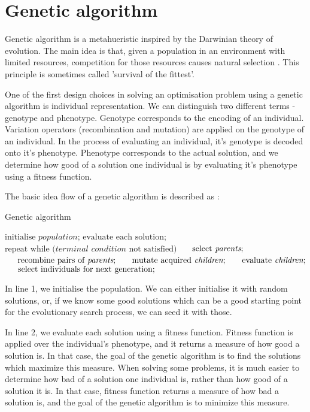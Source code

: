 \section{Genetic algorithm}
Genetic algorithm is a metahueristic inspired by the Darwinian theory of evolution. The main idea is that, given a population in an environment with limited resources, competition for those resources causes natural selection \citep{eiben2015evolutionarycomputing}.  This principle is sometimes called 'survival of the fittest'. 

One of the first design choices in solving an optimisation problem using a genetic algorithm is individual representation. We can distinguish two different terms - genotype and phenotype. Genotype corresponds to the encoding of an individual. Variation operators (recombination and mutation) are applied on the genotype of an individual. In the process of evaluating an individual, it's genotype is decoded onto it's phenotype. Phenotype corresponds to the actual solution, and we determine how good of a solution one individual is by evaluating it's phenotype using a fitness function.

The basic idea flow of a genetic algorithm is described as \citep{eiben2015evolutionarycomputing}:

\begin{algorithm}[]
\caption{Genetic algorithm}
\begin{algorithmic}[1]
\State $\text{initialise } \textit{population} \text{;}$
\State $\text{evaluate } \text{each solution};$
\State $\text{repeat while (} \textit{terminal condition} \text{ not satisfied)}$
\State $\indent \text{select } \textit{parents} \text{;}$
\State $\indent \text{recombine pairs of } \textit{parents} \text{;}$
\State $\indent \text{mutate acquired } \textit{children} \text{;}$
\State $\indent \text{evaluate } \textit{children} \text{;}$
\State $\indent \text{select individuals for next generation;}$
\end{algorithmic}
\end{algorithm}

In line 1, we initialise the population. We can either initialise it with random solutions, or, if we know some good solutions which can be a good starting point for the evolutionary search process, we can seed it with those.

In line 2, we evaluate each solution using a fitness function. Fitness function is applied over the individual's phenotype, and it returns a measure of how good a solution is. In that case, the goal of the genetic algorithm is to find the solutions which maximize this measure. When solving some problems, it is much easier to determine how bad of a solution one individual is, rather than how good of a solution it is. In that case, fitness function returns a measure of how bad a solution is, and the goal of the genetic algorithm is to minimize this measure.

